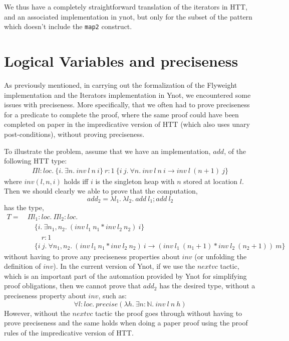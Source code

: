 \documentclass[a4paper,english]{article}
\newcommand{\N}[0]{\mathbb{N}}
\newcommand{\LOC}[0]{loc}
\begin{document}
\bigskip

We thus have a completely straightforward translation of the iterators in HTT,
and an associated implementation in ynot, but only for the subset of the
pattern which doesn't include the {\tt map2} construct.

\section{Logical Variables and preciseness}\label{logical-var}

As previously mentioned, in carrying out the formalization of the Flyweight
implementation and the Iterators implementation in Ynot, we encountered some
issues with preciseness. More specifically, that we often had to prove
preciseness for a predicate to complete the proof, where the same proof could
have been completed on paper in the impredicative version of HTT (which also
uses unary post-conditions), without proving preciseness.

To illustrate the problem, assume that we have an implementation, $add$, of the
following HTT type:
\begin{align*}
\Pi l : \LOC.\ \{ i.\ \exists n.\ inv\ l\ n\ i \}\ r : 1\ \{ i\ j.\ \forall n.\ inv\ l\ n\ i \rightarrow inv\ l\ (n+1)\ j \}
\end{align*}
where $inv(l, n, i)$ holds iff $i$ is the singleton heap with $n$ stored at
location $l$. Then we should clearly we able to prove that the computation,
$$add_2 = \lambda l_1.\ \lambda l_2.\ add\ l_1; add\ l_2$$
has the type,
\begin{align*}
T =\ &\Pi l_1 : \LOC.\ \Pi l_2 : \LOC.\\
&\quad\{ i.\ \exists n_1, n_2.\ (inv\ l_1\ n_1 * inv\ l_2\ n_2)\ i \}\\
&\quad\quad r : 1\\
&\quad\{ i\ j.\ \forall n_1, n_2.\ (inv\ l_1\ n_1 * inv\ l_2\ n_2)\ i \rightarrow (inv\ l_1\ (n_1+1) * inv\ l_2\ (n_2+1))\ m \}
\end{align*}
without having to prove any preciseness properties about $inv$ (or unfolding
the definition of $inv$). In the current version of Ynot, if we use the
$nextvc$ tactic, which is an important part of the automation provided by Ynot
for simplifying proof obligations, then we cannot prove that $add_2$ has the
desired type, without a preciseness property about $inv$, such as: $$\forall l
: \LOC.\ precise (\lambda h.\ \exists n : \N.\ inv\ l\ n\ h)$$ However, without
the $nextvc$ tactic the proof goes through without having to prove preciseness
and the same holds when doing a paper proof using the proof rules of the
impredicative version of HTT.
\end{document}
